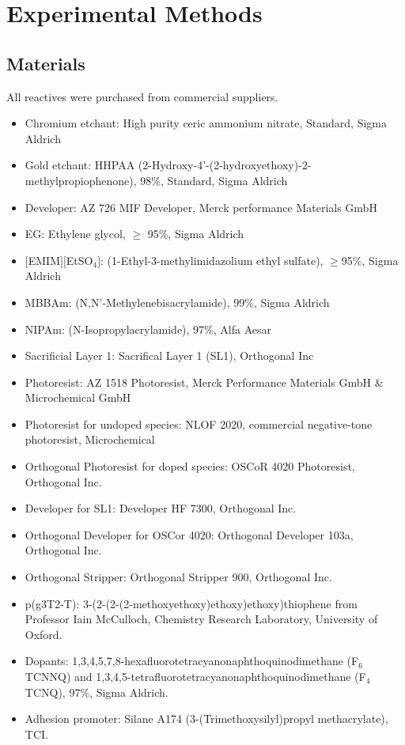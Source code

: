 \chapter{Experimental Methods} \label{cha:2}

\section{Materials}
All reactives were purchased from commercial suppliers. %

\begin{itemize}
\item Chromium etchant: High purity ceric ammonium nitrate, Standard, Sigma Aldrich
\item Gold etchant:  HHPAA (2-Hydroxy-4’-(2-hydroxyethoxy)-2-methylpropiophenone), 98$\%$, Standard, Sigma Aldrich
\item Developer: AZ 726 MIF Developer, Merck performance Materials GmbH
\item EG: Ethylene glycol, $\geq$ 95$\%$, Sigma Aldrich
\item $[$EMIM$][$EtSO$_{4}]$: (1-Ethyl-3-methylimidazolium ethyl sulfate), $\geq$95$\%$, Sigma Aldrich 
\item MBBAm: (N,N’-Methylenebisacrylamide), 99$\%$, Sigma Aldrich 
\item NIPAm: (N-Isopropylacrylamide), 97$\%$, Alfa Aesar 
\item Sacrificial Layer 1: Sacrifical Layer 1 (SL1), Orthogonal Inc
\item Photoresist: AZ 1518 Photoresist, Merck Performance Materials GmbH \& Microchemical GmbH
\item Photoresist for undoped species: NLOF 2020, commercial negative-tone photoresist, Microchemical
\item Orthogonal Photoresist for doped species: OSCoR 4020 Photoresist, Orthogonal Inc.
\item Developer for SL1: Developer HF 7300, Orthogonal Inc.
\item Orthogonal Developer for OSCor 4020: Orthogonal Developer 103a, Orthogonal Inc.
\item Orthogonal Stripper: Orthogonal Stripper 900, Orthogonal Inc. 
\item p(g3T2-T): 3-(2-(2-(2-methoxyethoxy)ethoxy)ethoxy)thiophene from Professor Iain McCulloch, Chemistry Research Laboratory, University of Oxford. 
\item Dopants: 1,3,4,5,7,8-hexafluorotetracyanonaphthoquinodimethane (F$_{6}$TCNNQ) and 1,3,4,5-tetrafluorotetracyanonaphthoquinodimethane (F$_{4}$TCNQ), 97$\%$, Sigma Aldrich.
\item Adhesion promoter: Silane A174 (3-(Trimethoxysilyl)propyl methacrylate), TCI.

\end{itemize}

